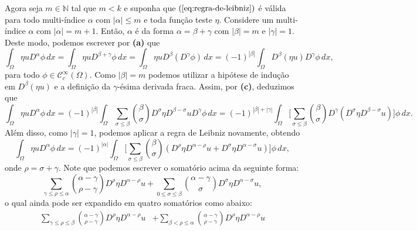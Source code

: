 \documentclass[a4paper, 11pt]{book}
\theoremstyle{definition}
\newcommand{\bN}{\mathbb{N}}
\newcommand{\cC}{\mathcal{C}}
\begin{document}
\begin{prf}
    Agora seja $m \in \bN$ tal que $m < k$ e suponha que $(\ref{eq:regra-de-leibniz})$ é válida para todo multi-índice $\alpha$ com $|\alpha| \leqslant m$ e toda função teste $\eta$.
    Considere um multi-índice $\alpha$ com $|\alpha| = m + 1$.
    Então, $\alpha$ é da forma $\alpha = \beta + \gamma$ com $|\beta| = m$ e $|\gamma| = 1$. 
    Deste modo, podemos escrever por \textbf{(a)} que
    \[
        \int_\Omega \eta u D^{\alpha}\phi \, dx = \int_\Omega \eta u D^{\beta + \gamma}\phi \, dx = \int_\Omega \eta u D^\beta(D^\gamma \phi) \, dx = (-1)^{|\beta|} \int_\Omega D^{\beta} (\eta u) D^{\gamma}\phi \,dx,
    \]
    para todo $\phi \in \cC^{\infty}_c(\Omega)$.
    Como $|\beta| = m$ podemos utilizar a hipótese de indução em $D^{\beta}(\eta u)$ e a definição da $\gamma$-ésima derivada fraca. Assim, por \textbf{(c)}, deduzimos que
    {\small
    \[
        \int_\Omega \eta u D^{\alpha}\phi \, dx = (-1)^{|\beta|} \int_\Omega \sum_{\sigma \leqslant \beta} \binom{\beta}{\sigma} D^{\sigma} \eta D^{\beta - \sigma} u D^{\gamma}\phi \, dx = (-1)^{|\beta| + |\gamma|} \int_\Omega \bigg[\sum_{\sigma \leqslant \beta} \binom{\beta}{\sigma} D^{\gamma}(D^{\sigma} \eta D^{\beta - \sigma} u)\bigg] \phi \, dx.
    \]}\!
    Além disso, como $|\gamma| = 1$, podemos aplicar a regra de Leibniz novamente, obtendo
    \begin{equation} \label{eq:integral-etau}
        \int_\Omega \eta u D^{\alpha}\phi \, dx = (-1)^{|\alpha|} \int_\Omega \bigg[\sum_{\sigma \leqslant \beta} \binom{\beta}{\sigma} \left(D^{\rho}\eta D^{\alpha - \rho} u + D^{\sigma} \eta D^{\alpha - \sigma} u\right)\bigg] \phi \,dx,
    \end{equation}
    onde $\rho = \sigma + \gamma$. 
    Note que podemos escrever o somatório acima da seguinte forma:
    \begin{equation*} \label{eq:somatorio}
        \sum_{\gamma \leqslant \rho \leqslant \alpha} \binom{\alpha - \gamma}{\rho - \gamma} D^{\rho}\eta D^{\alpha - \rho} u + \sum_{0 \leqslant\sigma \leqslant \beta} \binom{\alpha - \gamma}{\sigma} D^{\sigma} \eta D^{\alpha - \sigma} u,
    \end{equation*}
    o qual ainda pode ser expandido em quatro somatórios como abaixo:
    \begin{equation} \label{eq:somatorio-2}
        \begin{aligned}
            \sum_{\gamma \leqslant \rho \leqslant \beta} \binom{\alpha - \gamma}{\rho - \gamma} D^{\rho}\eta D^{\alpha - \rho} u &+ \sum_{\beta < \rho \leqslant \alpha} \binom{\alpha - \gamma}{\rho - \gamma} D^{\rho}\eta D^{\alpha - \rho} u \\

\end{aligned}
\end{equation}
\end{prf}
\end{document}
